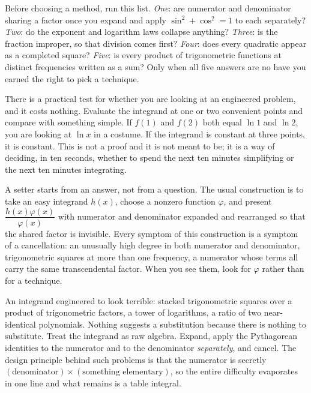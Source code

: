\begin{keynote}
Before choosing a method, run this list. \emph{One}: are numerator and denominator sharing a factor once you expand and apply $\sin^2+\cos^2=1$ to each separately? \emph{Two}: do the exponent and logarithm laws collapse anything? \emph{Three}: is the fraction improper, so that division comes first? \emph{Four}: does every quadratic appear as a completed square? \emph{Five}: is every product of trigonometric functions at distinct frequencies written as a sum? Only when all five answers are no have you earned the right to pick a technique.
\end{keynote}

There is a practical test for whether you are looking at an engineered problem, and it costs nothing. Evaluate the integrand at one or two convenient points and compare with something simple. If $f(1)$ and $f(2)$ both equal $\ln1$ and $\ln2$, you are looking at $\ln x$ in a costume. If the integrand is constant at three points, it is constant. This is not a proof and it is not meant to be; it is a way of deciding, in ten seconds, whether to spend the next ten minutes simplifying or the next ten minutes integrating.

\begin{keynote}
A setter starts from an answer, not from a question. The usual construction is to take an easy integrand $h(x)$, choose a nonzero function $\varphi$, and present $\dfrac{h(x)\varphi(x)}{\varphi(x)}$ with numerator and denominator expanded and rearranged so that the shared factor is invisible. Every symptom of this construction is a symptom of a cancellation: an unusually high degree in both numerator and denominator, trigonometric squares at more than one frequency, a numerator whose terms all carry the same transcendental factor. When you see them, look for $\varphi$ rather than for a technique.
\end{keynote}

\cue An integrand engineered to look terrible: stacked trigonometric squares over a product of trigonometric factors, a tower of logarithms, a ratio of two near-identical polynomials. Nothing suggests a substitution because there is nothing to substitute.
\method Treat the integrand as raw algebra. Expand, apply the Pythagorean identities to the numerator and to the denominator \emph{separately}, and cancel. The design principle behind such problems is that the numerator is secretly $(\text{denominator})\times(\text{something elementary})$, so the entire difficulty evaporates in one line and what remains is a table integral.

